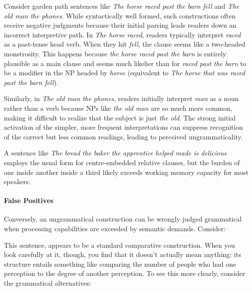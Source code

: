 Consider garden path sentences like \textit{The horse raced past the barn fell} and \textit{The old man the phones}. While syntactically well formed, such constructions often receive negative judgments because their initial parsing leads readers down an incorrect interpretive path. In \textit{The horse raced}, readers typically interpret \textit{raced} as a past-tense head verb. When they hit \textit{fell}, the clause seems like a two-headed monstrosity. This happens because \textit{the horse raced past the barn} is entirely plausible as a main clause and seems much likelier than for \textit{raced past the barn} to be a modifier in the NP headed by \textit{horse} (equivalent to \textit{The horse that was raced past the barn fell}).

Similarly, in \textit{The old man the phones}, readers initially interpret \textit{man} as a noun rather than a verb because NPs like \textit{the old man} are so much more common, making it difficult to realize that the subject is just \textit{the old}. The strong initial activation of the simpler, more frequent interpretations can suppress recognition of the correct but less common readings, leading to perceived ungrammaticality.

A sentence like \textit{The bread the baker the apprentice helped made is delicious} employs the usual form for centre-embedded relative clauses, but the burden of one inside another inside a third likely exceeds working memory capacity for most speakers.

\paragraph*{False Positives}
Conversely, an ungrammatical construction can be wrongly judged grammatical when processing capabilities are exceeded by semantic demands. Consider:
\z

This sentence, appears to be a standard comparative construction. When you look carefully at it, though, you find that it doesn't actually mean anything: its structure entails something like comparing the number of people who had one perception to the degree of another perception. To see this more clearly, consider the grammatical alternatives:

\z

